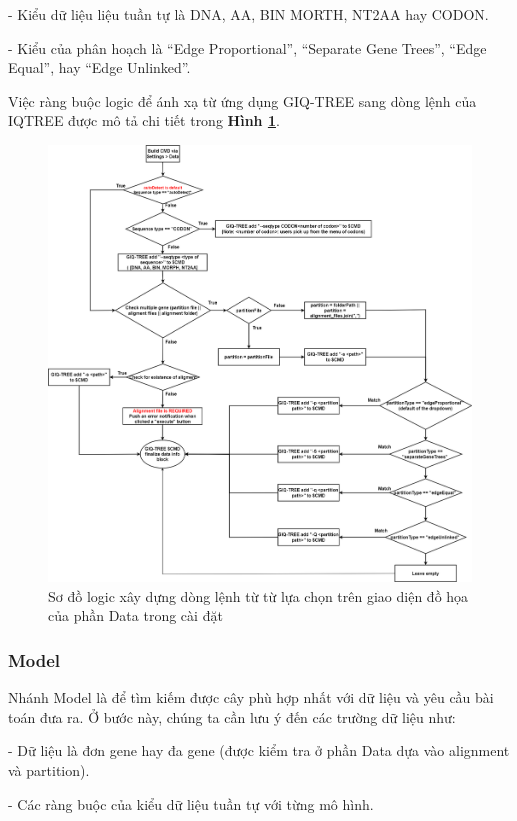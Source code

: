 \documentclass[12pt]{report}
\begin{document}
- Kiểu dữ liệu liệu tuần tự là DNA, AA, BIN MORTH, NT2AA hay CODON.

- Kiểu của phân hoạch là “Edge Proportional”, “Separate Gene Trees”, “Edge Equal”, hay “Edge Unlinked”.

Việc ràng buộc logic để ánh xạ từ ứng dụng GIQ-TREE sang dòng lệnh của IQTREE được mô tả chi tiết trong \textbf{Hình \ref{fig:image4.8}}.

\begin{figure}[h]
	\centering
	\includegraphics[scale=0.32]{Image/4.8.png}
	\caption{Sơ đồ logic xây dựng dòng lệnh từ từ lựa chọn trên giao diện đồ họa của phần Data trong cài đặt }
	\label{fig:image4.8}
\end{figure}

\subsubsection{Model}
Nhánh Model là để tìm kiếm được cây phù hợp nhất với dữ liệu và yêu cầu bài toán đưa ra. Ở bước này, chúng ta cần lưu ý đến các trường dữ liệu như:

- Dữ liệu là đơn gene hay đa gene (được kiểm tra ở phần Data dựa vào alignment và partition).

- Các ràng buộc của kiểu dữ liệu tuần tự với từng mô hình.
\end{document}

